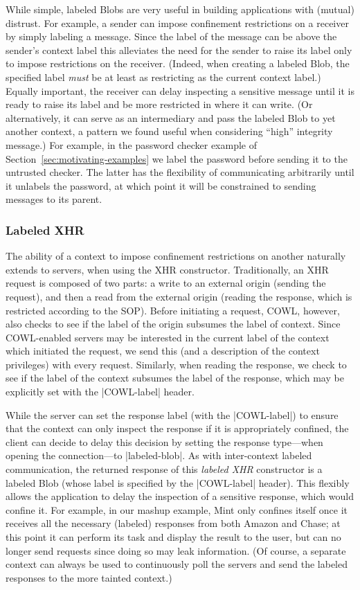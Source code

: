 While simple, labeled Blobs are very useful in building applications
with (mutual) distrust.
%
For example, a sender can impose confinement restrictions on a
receiver by simply labeling a message.
%
Since the label of the message can be above the sender's context label
this alleviates the need for the sender to raise its label only to
impose restrictions on the receiver.
%
(Indeed, when creating a labeled Blob, the specified label \emph{must}
be at least as restricting as the current context label.)
%
Equally important, the receiver can delay inspecting a sensitive
message until it is ready to raise its label and be more restricted in
where it can write.
%
(Or alternatively, it can serve as an intermediary and pass the
labeled Blob to yet another context, a pattern we found useful when
considering ``high'' integrity message.)
%
For example, in the password checker example of
Section~\ref{sec:motivating-examples} we label the password
 before sending it to the untrusted checker.
%
The latter has the flexibility of communicating arbitrarily until it
unlabels the password, at which point it will be constrained to
sending messages to its parent.

\subsubsection{Labeled XHR}
\label{sec:system:labeled-xhr}
The ability of a context to impose confinement restrictions on
another naturally extends to servers, when using the XHR constructor.
% 
Traditionally, an XHR request is composed of two parts: a write to an
external origin (sending the request), and then a read from the external
origin (reading the response, which is restricted according to the
SOP).
%
Before initiating a request, COWL, however, also checks to see
if the label of the origin subsumes the label of context. 
%
Since COWL-enabled servers may be interested in the current label of
the context which initiated the request, we send this (and a
description of the context privileges) with every request.
%
Similarly, when reading the response, we check to see if the label of
the context subsumes the label of the response, which may be
explicitly set with the \js|COWL-label| header.
%

While the server can set the response label (with the \js|COWL-label|)
to ensure that the context can only inspect the response if it is
appropriately confined, the client can decide to delay this decision by
setting the response type---when opening the connection---to
\js|labeled-blob|.
%
As with inter-context labeled communication, the returned response
of this \emph{labeled XHR} constructor is a labeled Blob (whose label
is specified by the \js|COWL-label| header).
%
This flexibly allows the application to delay the inspection of a
sensitive response, which would confine it.
%
For example, in our mashup example, Mint only confines itself once it
receives all the necessary (labeled) responses from both Amazon and
Chase; at this point it can perform its task and display the result to
the user, but can no longer send requests since doing so may leak
information.
%
(Of course, a separate context can always be used to continuously poll
the servers and send the labeled responses to the more tainted
context.)

